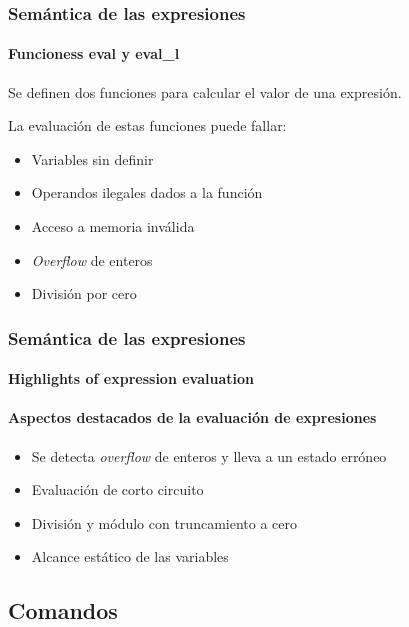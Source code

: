 \begin{frame}
\frametitle{Semántica de las expresiones}
\framesubtitle{Funcioness eval y eval\_l}

Se definen dos funciones para calcular el valor de una expresión.

\bigskip

La evaluación de estas funciones puede fallar:

\bigskip
\pause

\begin{itemize}
\item{Variables sin definir}
\pause
\item{Operandos ilegales dados a la función}
\pause
\item{Acceso a memoria inválida}
\pause
\item{\textit{Overflow} de enteros}
\pause
\item{División por cero}
\end{itemize}


\end{frame}


\begin{frame}
\frametitle{Semántica de las expresiones}
\framesubtitle{Highlights of expression evaluation}
\framesubtitle{Aspectos destacados de la evaluación de expresiones}

\begin{itemize}
\item{Se detecta \textit{overflow} de enteros y lleva a un estado erróneo}
\item{Evaluación de corto circuito}
\item{División y módulo con truncamiento a cero}
\item{Alcance estático de las variables}
\end{itemize}


\end{frame}


\subsection{Comandos}


\begin{comment}
\begin{frame}[fragile]
\frametitle{Syntax of commands}
\framesubtitle{Concrete syntax}

\begin{semiverbatim}
com ::= SKIP
     | lexp ::== exp
     | vname ::= exp
     | com ;; com
     | IF exp THEN com ELSE com
     | WHILE exp DO com
     | FREE lexp
     | RETURN exp
     | RETURNV
     | lexp ::== f ( [exp] )
     | vname ::= f ( [exp] )
     | CALL f ( [exp])
\end{semiverbatim}


\end{frame}
\end{comment}


